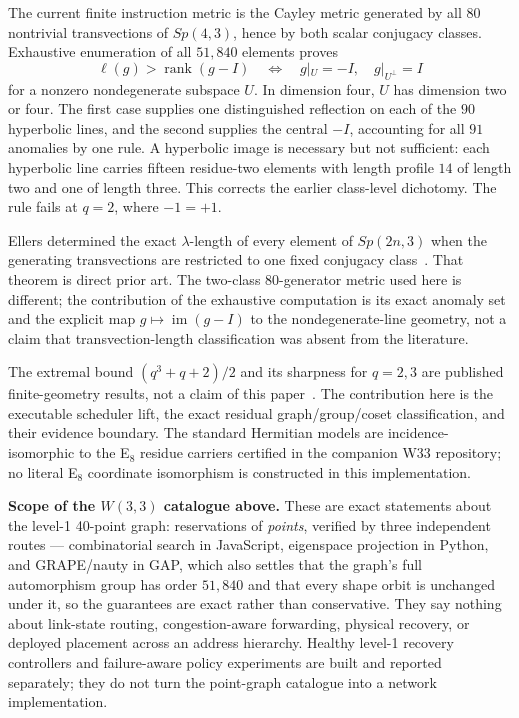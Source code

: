 \documentclass[11pt,letterpaper]{article}
\newcommand{\W}{\ensuremath{W(3,3)}}
\begin{document}
The current finite instruction metric is the Cayley metric generated by all
$80$ nontrivial transvections of $Sp(4,3)$, hence by both scalar conjugacy
classes. Exhaustive enumeration of all $51,840$ elements proves
\[
 \ell(g)>\operatorname{rank}(g-I)
 \quad\Longleftrightarrow\quad
 g|_U=-I,\quad g|_{U^\perp}=I
\]
for a nonzero nondegenerate subspace $U$. In dimension four, $U$ has dimension
two or four. The first case supplies one distinguished reflection on each of
the $90$ hyperbolic lines, and the second supplies the central $-I$, accounting
for all $91$ anomalies by one rule. A hyperbolic image is necessary but not
sufficient: each hyperbolic line carries fifteen residue-two elements with
length profile $14$ of length two and one of length three. This corrects the
earlier class-level dichotomy. The rule fails at $q=2$, where $-1=+1$.

Ellers determined the exact $\lambda$-length of every element of $Sp(2n,3)$
when the generating transvections are restricted to one fixed conjugacy
class~\cite{ellers1994transvections}. That theorem is direct prior art. The
two-class $80$-generator metric used here is different; the contribution of
the exhaustive computation is its exact anomaly set and the explicit map
$g\mapsto\operatorname{im}(g-I)$ to the nondegenerate-line geometry, not a
claim that transvection-length classification was absent from the literature.

The extremal bound $(q^3+q+2)/2$ and its sharpness for $q=2,3$ are published
finite-geometry results, not a claim of this paper~\cite{debeule2008hermitian}.
The contribution here is the executable scheduler lift, the exact residual
graph/group/coset classification, and their evidence boundary. The standard
Hermitian models are incidence-isomorphic to the E$_8$ residue carriers
certified in the companion W33 repository; no literal E$_8$ coordinate
isomorphism is constructed in this implementation.

\begin{scopebox}
\textbf{Scope of the \W{} catalogue above.} These are exact statements about
the level-1 40-point graph:
reservations of \emph{points}, verified by three independent routes ---
combinatorial search in JavaScript, eigenspace projection in Python, and
GRAPE/nauty in GAP, which also settles that the graph's full automorphism group
has order $51{,}840$ and that every shape orbit is unchanged under it, so the
guarantees are exact rather than conservative. They say nothing about
link-state routing, congestion-aware forwarding, physical recovery, or deployed
placement across an address hierarchy. Healthy level-1 recovery controllers and
failure-aware policy experiments are built and reported separately; they do not
turn the point-graph catalogue into a network implementation.
\end{scopebox}
\end{document}

